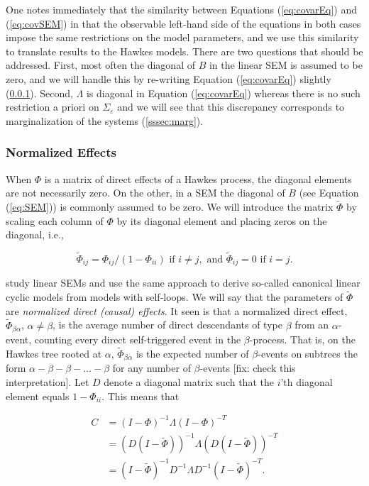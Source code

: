 \documentclass[accepted]{uai2021} %
\begin{document}
One notes immediately that the similarity between Equations (\ref{eq:covarEq}) 
and (\ref{eq:covSEM}) in that the observable left-hand side of the equations in 
both cases impose the same restrictions on the model parameters, and we use 
this similarity to translate results to the Hawkes models. There are two 
questions that should be addressed. First, most often the diagonal of $B$ in 
the linear SEM is assumed to be zero, and we will handle this by re-writing 
Equation (\ref{eq:covarEq}) slightly (\ref{sssec:normEff}). Second, $\Lambda$ 
is diagonal in Equation (\ref{eq:covarEq}) whereas there is no such restriction 
a priori on $\Sigma_\varepsilon$ and we will see that this discrepancy 
corresponds to marginalization of the systems (\ref{sssec:marg}).


\subsubsection{Normalized Effects}
\label{sssec:normEff}

When $\Phi$ is a matrix of direct effects of a Hawkes process, the diagonal 
elements are not necessarily zero. On the other, in a SEM the diagonal of $B$ 
(see Equation (\ref{eq:SEM})) is commonly assumed to be zero. We will introduce 
the matrix $\tilde{\Phi}$ by scaling each column of $\Phi$ by its 
diagonal element and placing zeros on the diagonal, i.e.,

$$
\tilde{\Phi}_{ij} = \Phi_{ij}/(1-\Phi_{ii})  \text{ if } i\neq j, \text{ and } 
\tilde{\Phi}_{ij} 
= 0 \text{ if } i= j.
$$

\cite{hyttinen2012} study linear SEMs and use the same approach to derive 
so-called canonical linear 
cyclic models from models with self-loops. We 
will say that the parameters of $\tilde{\Phi}$ are \emph{normalized direct
(causal) effects}. It seen is that a normalized direct effect, 
$\tilde{\Phi}_{\beta\alpha}$, $\alpha\neq\beta$, is the average number of 
direct 
descendants of type 
$\beta$ from an $\alpha$-event, counting every direct self-triggered event in 
the $\beta$-process. 
That is, on the Hawkes tree rooted at $\alpha$, $\tilde{\Phi}_{\beta\alpha}$ is 
the expected number of $\beta$-events on subtrees the form $\alpha - \beta - 
\beta - \ldots - 
\beta$ for any number of $\beta$-events
[fix: check this interpretation]. 
Let $D$ denote a 
diagonal matrix such that the $i$'th diagonal element equals 
$1 - \Phi_{ii}$. This means that 

\begin{align*}
C & = (I - \Phi)^{-1}\Lambda (I - \Phi)^{-T}  \\
& = (D(I - \tilde{\Phi}))^{-1}\Lambda (D(I - \tilde{\Phi}))^{-T} \\
& = (I - \tilde{\Phi})^{-1}D^{-1} \Lambda D^{-1}(I - 
\tilde{\Phi})^{-T}.
\label{eq:Gtilde}
\end{align*}
\end{document}
